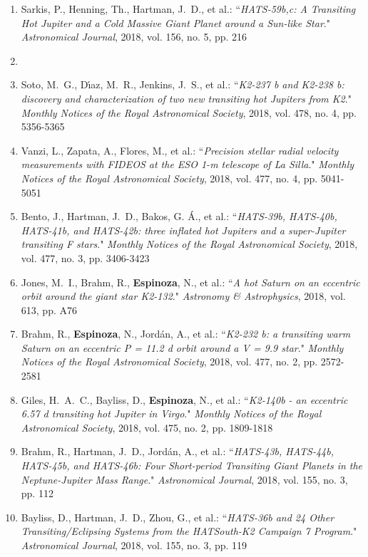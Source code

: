 \documentclass[12pt, a4paper]{article} %
\begin{document}
\begin{flushleft}
\begin{enumerate}
\item Sarkis, P., Henning, Th., Hartman, J.~D., et al.: ``\textit{HATS-59b,c: A Transiting Hot Jupiter and a Cold Massive Giant Planet around a Sun-like Star}." \textit{Astronomical Journal}, 2018, vol. 156, no. 5, pp. 216
\item  {}
\item Soto, M.~G., Dı́az, M.~R., Jenkins, J.~S., et al.: ``\textit{K2-237 b and K2-238 b: discovery and characterization of two new transiting hot Jupiters from K2}." \textit{Monthly Notices of the Royal Astronomical Society}, 2018, vol. 478, no. 4, pp. 5356-5365
\item Vanzi, L., Zapata, A., Flores, M., et al.: ``\textit{Precision stellar radial velocity measurements with FIDEOS at the ESO 1-m telescope of La Silla}." \textit{Monthly Notices of the Royal Astronomical Society}, 2018, vol. 477, no. 4, pp. 5041-5051
\item Bento, J., Hartman, J.~D., Bakos, G. Á., et al.: ``\textit{HATS-39b, HATS-40b, HATS-41b, and HATS-42b: three inflated hot Jupiters and a super-Jupiter transiting F stars}." \textit{Monthly Notices of the Royal Astronomical Society}, 2018, vol. 477, no. 3, pp. 3406-3423
\item Jones, M.~I., Brahm, R., \textbf{Espinoza}, N., et al.: ``\textit{A hot Saturn on an eccentric orbit around the giant star K2-132}." \textit{Astronomy \& Astrophysics}, 2018, vol. 613, pp. A76
\item Brahm, R., \textbf{Espinoza}, N., Jordán, A., et al.: ``\textit{K2-232 b: a transiting warm Saturn on an eccentric P = 11.2 d orbit around a V = 9.9 star}." \textit{Monthly Notices of the Royal Astronomical Society}, 2018, vol. 477, no. 2, pp. 2572-2581
\item Giles, H.~A.~C., Bayliss, D., \textbf{Espinoza}, N., et al.: ``\textit{K2-140b - an eccentric 6.57 d transiting hot Jupiter in Virgo}." \textit{Monthly Notices of the Royal Astronomical Society}, 2018, vol. 475, no. 2, pp. 1809-1818
\item Brahm, R., Hartman, J.~D., Jordán, A., et al.: ``\textit{HATS-43b, HATS-44b, HATS-45b, and HATS-46b: Four Short-period Transiting Giant Planets in the Neptune-Jupiter Mass Range}." \textit{Astronomical Journal}, 2018, vol. 155, no. 3, pp. 112
\item Bayliss, D., Hartman, J.~D., Zhou, G., et al.: ``\textit{HATS-36b and 24 Other Transiting/Eclipsing Systems from the HATSouth-K2 Campaign 7 Program}." \textit{Astronomical Journal}, 2018, vol. 155, no. 3, pp. 119

\end{enumerate}
\end{flushleft}
\end{document}
